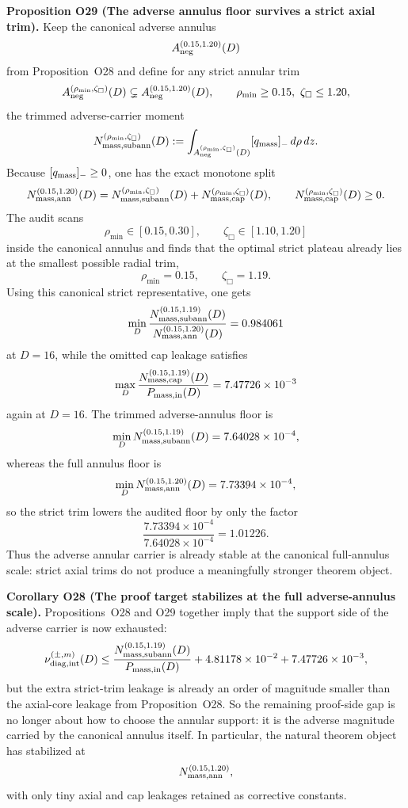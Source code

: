 \documentclass[aps,prd,onecolumn,notitlepage,nofootinbib,superscriptaddress,11pt,floatfix]{revtex4-2}
\begin{document}
\medskip\noindent\textbf{Proposition O29 (The adverse annulus floor survives a strict axial trim).}
Keep the canonical adverse annulus
\[
A_{\rm neg}^{(0.15,1.20)}(D)
\]
from Proposition~O28 and define for any strict annular trim
\[
A_{\rm neg}^{(\rho_{\min},\zeta_{\Box})}(D)
\subsetneq
A_{\rm neg}^{(0.15,1.20)}(D),
\qquad
\rho_{\min}\ge 0.15,\ \zeta_{\Box}\le 1.20,
\]
the trimmed adverse-carrier moment
\[
N_{\rm mass,subann}^{(\rho_{\min},\zeta_{\Box})}(D)
:=
\int_{A_{\rm neg}^{(\rho_{\min},\zeta_{\Box})}(D)} [q_{\rm mass}]_-\,d\rho\,dz.
\]
Because \([q_{\rm mass}]_-\ge 0\), one has the exact monotone split
\[
N_{\rm mass,ann}^{(0.15,1.20)}(D)
=
N_{\rm mass,subann}^{(\rho_{\min},\zeta_{\Box})}(D)
+
N_{\rm mass,cap}^{(\rho_{\min},\zeta_{\Box})}(D),
\qquad
N_{\rm mass,cap}^{(\rho_{\min},\zeta_{\Box})}(D)\ge 0.
\]
The audit
scans
\[
\rho_{\min}\in[0.15,0.30],
\qquad
\zeta_{\Box}\in[1.10,1.20]
\]
inside the canonical annulus and finds that the optimal strict plateau already lies at the smallest possible radial trim,
\[
\rho_{\min}=0.15,
\qquad
\zeta_{\Box}=1.19.
\]
Using this canonical strict representative, one gets
\[
\min_D
\frac{N_{\rm mass,subann}^{(0.15,1.19)}(D)}
{N_{\rm mass,ann}^{(0.15,1.20)}(D)}
=
0.984061
\]
at \(D=16\), while the omitted cap leakage satisfies
\[
\max_D
\frac{N_{\rm mass,cap}^{(0.15,1.19)}(D)}
{P_{\rm mass,in}(D)}
=
7.47726\times10^{-3}
\]
again at \(D=16\). The trimmed adverse-annulus floor is
\[
\min_D N_{\rm mass,subann}^{(0.15,1.19)}(D)
=
7.64028\times10^{-4},
\]
whereas the full annulus floor is
\[
\min_D N_{\rm mass,ann}^{(0.15,1.20)}(D)
=
7.73394\times10^{-4},
\]
so the strict trim lowers the audited floor by only the factor
\[
\frac{7.73394\times10^{-4}}{7.64028\times10^{-4}}
=
1.01226.
\]
Thus the adverse annular carrier is already stable at the canonical full-annulus scale: strict axial trims do not produce a meaningfully stronger theorem object.

\medskip\noindent\textbf{Corollary O28 (The proof target stabilizes at the full adverse-annulus scale).}
Propositions~O28 and O29 together imply that the support side of the adverse carrier is now exhausted:
\[
\nu_{\rm diag,int}^{(\pm,m)}(D)
\le
\frac{N_{\rm mass,subann}^{(0.15,1.19)}(D)}{P_{\rm mass,in}(D)}
+
4.81178\times10^{-2}
+
7.47726\times10^{-3},
\]
but the extra strict-trim leakage is already an order of magnitude smaller than the axial-core leakage from Proposition~O28. So the remaining proof-side gap is no longer about how to choose the annular support: it is the adverse magnitude carried by the canonical annulus itself. In particular, the natural theorem object has stabilized at
\[
N_{\rm mass,ann}^{(0.15,1.20)},
\]
with only tiny axial and cap leakages retained as corrective constants.
\end{document}
